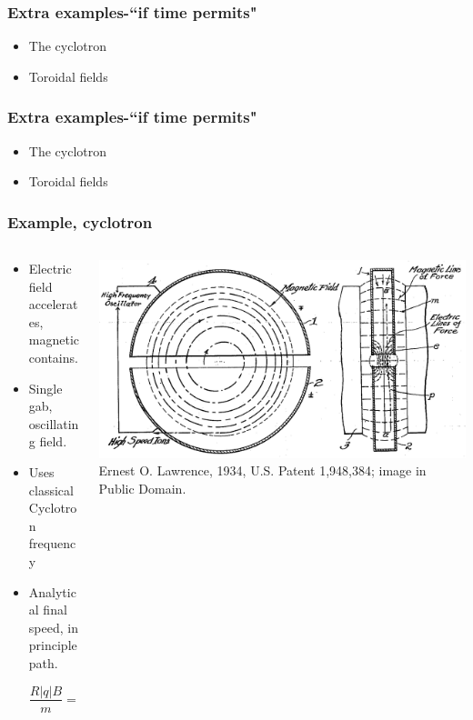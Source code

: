 \documentclass{beamer}
\begin{document}
\begin{frame}
\frametitle{Extra examples-``if time permits" }
\begin{itemize}
\item<1-> The cyclotron

\item<2-> Toroidal fields
\end{itemize}
\end{frame}

\begin{frame}
\frametitle{Extra examples-``if time permits" }
\begin{itemize}
\item<1-> The cyclotron

\item<2-> Toroidal fields
\end{itemize}
\end{frame}

\begin{frame}
\frametitle{Example, cyclotron}
\begin{columns}
\begin{column}{0.5\linewidth}
\begin{itemize}
\item<1-> Electric field accelerates, magnetic contains.

\item<2-> Single gab, oscillating field.

\item<3-> Uses classical Cyclotron frequency

\item<4-> Analytical final speed, in principle path.

\begin{equation*}
\frac{R|q|B}{m} = v_\perp
\end{equation*}

\end{itemize}
\end{column}
\begin{column}{0.5\linewidth}
\includegraphics[width=\linewidth]{ Cyclotron_patent.png}
{\color{gray} Ernest O. Lawrence, 1934, U.S. Patent 1,948,384; image in Public Domain.}
\end{column}
\end{columns}
\end{frame}
\end{document}
